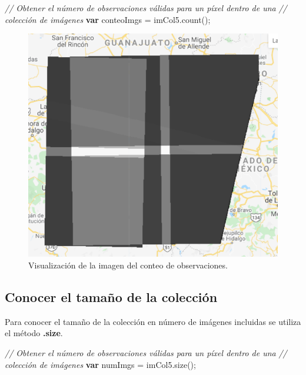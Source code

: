 \documentclass[
  12pt,
  letterpaper,
  twoside]{book}
\newenvironment{Shaded}{\begin{snugshade}}{\end{snugshade}}
\newcommand{\CommentTok}[1]{\textcolor[rgb]{0.24,0.58,0.00}{\textit{#1}}}
\newcommand{\ControlFlowTok}[1]{\textcolor[rgb]{0.00,0.00,0.00}{\textbf{#1}}}
\newcommand{\FunctionTok}[1]{\textcolor[rgb]{0.48,0.12,0.64}{#1}}
\newcommand{\NormalTok}[1]{#1}
\newcommand{\OperatorTok}[1]{\textcolor[rgb]{0.00,0.00,0.00}{#1}}
\newcommand\boldpurple[1]{\textcolor{darkpurple}{\textbf{#1}}}
\begin{document}
\begin{Shaded}
\begin{Highlighting}[]
\CommentTok{// Obtener el número de observaciones válidas para un píxel dentro de una }
\CommentTok{// colección de imágenes}
\ControlFlowTok{var}\NormalTok{ conteoImgs }\OperatorTok{=}\NormalTok{ imCol5}\OperatorTok{.}\FunctionTok{count}\NormalTok{()}\OperatorTok{;}
\end{Highlighting}
\end{Shaded}

\begin{figure}[H]

{\centering \includegraphics[width=0.8\linewidth]{Img/conteoim} 

}

\caption{Visualización de la imagen del conteo de observaciones.}\label{fig:f109}
\end{figure}

\hypertarget{conocer-el-tamauxf1o-de-la-colecciuxf3n}{%
\subsection*{Conocer el tamaño de la colección}\label{conocer-el-tamauxf1o-de-la-colecciuxf3n}}

Para conocer el tamaño de la colección en número de imágenes incluidas se utiliza el método \boldpurple{.size}.

\begin{Shaded}
\begin{Highlighting}[]
\CommentTok{// Obtener el número de observaciones válidas para un píxel dentro de una }
\CommentTok{// colección de imágenes}
\ControlFlowTok{var}\NormalTok{ numImgs }\OperatorTok{=}\NormalTok{ imCol5}\OperatorTok{.}\FunctionTok{size}\NormalTok{()}\OperatorTok{;}
\end{Highlighting}
\end{Shaded}
\end{document}
